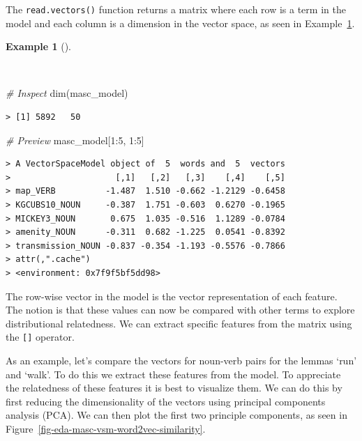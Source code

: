 \documentclass[
  letterpaper,
  DIV=11,
  numbers=noendperiod]{scrreprt}
\newenvironment{Shaded}{\begin{snugshade}}{\end{snugshade}}
\newcommand{\CommentTok}[1]{\textcolor[rgb]{0.00,0.00,0.00}{\textit{#1}}}
\newcommand{\DecValTok}[1]{\textcolor[rgb]{0.00,0.00,0.00}{#1}}
\newcommand{\FunctionTok}[1]{\textcolor[rgb]{0.00,0.00,0.00}{#1}}
\newcommand{\NormalTok}[1]{\textcolor[rgb]{0.00,0.00,0.00}{#1}}
\newcommand{\SpecialCharTok}[1]{\textcolor[rgb]{0.00,0.00,0.00}{#1}}
\theoremstyle{definition}
\newtheorem{example}{Example}[chapter]
\theoremstyle{remark}
\begin{document}
The \texttt{read.vectors()} function returns a matrix where each row is
a term in the model and each column is a dimension in the vector space,
as seen in Example~\ref{exm-eda-masc-vsm-word2vec-vector-object}.

\begin{example}[]\protect\hypertarget{exm-eda-masc-vsm-word2vec-vector-object}{}\label{exm-eda-masc-vsm-word2vec-vector-object}

~

\begin{Shaded}
\begin{Highlighting}[]
\CommentTok{\# Inspect}
\FunctionTok{dim}\NormalTok{(masc\_model)}
\end{Highlighting}
\end{Shaded}

\begin{verbatim}
> [1] 5892   50
\end{verbatim}

\begin{Shaded}
\begin{Highlighting}[]
\CommentTok{\# Preview}
\NormalTok{masc\_model[}\DecValTok{1}\SpecialCharTok{:}\DecValTok{5}\NormalTok{, }\DecValTok{1}\SpecialCharTok{:}\DecValTok{5}\NormalTok{]}
\end{Highlighting}
\end{Shaded}

\begin{verbatim}
> A VectorSpaceModel object of  5  words and  5  vectors
>                     [,1]   [,2]   [,3]    [,4]    [,5]
> map_VERB          -1.487  1.510 -0.662 -1.2129 -0.6458
> KGCUBS10_NOUN     -0.387  1.751 -0.603  0.6270 -0.1965
> MICKEY3_NOUN       0.675  1.035 -0.516  1.1289 -0.0784
> amenity_NOUN      -0.311  0.682 -1.225  0.0541 -0.8392
> transmission_NOUN -0.837 -0.354 -1.193 -0.5576 -0.7866
> attr(,".cache")
> <environment: 0x7f9f5bf5dd98>
\end{verbatim}

\end{example}

The row-wise vector in the model is the vector representation of each
feature. The notion is that these values can now be compared with other
terms to explore distributional relatedness. We can extract specific
features from the matrix using the \texttt{{[}{]}} operator.

As an example, let's compare the vectors for noun-verb pairs for the
lemmas `run' and `walk'. To do this we extract these features from the
model. To appreciate the relatedness of these features it is best to
visualize them. We can do this by first reducing the dimensionality of
the vectors using principal components analysis (PCA). We can then plot
the first two principle components, as seen in
Figure~\ref{fig-eda-masc-vsm-word2vec-similarity}.
\end{document}
